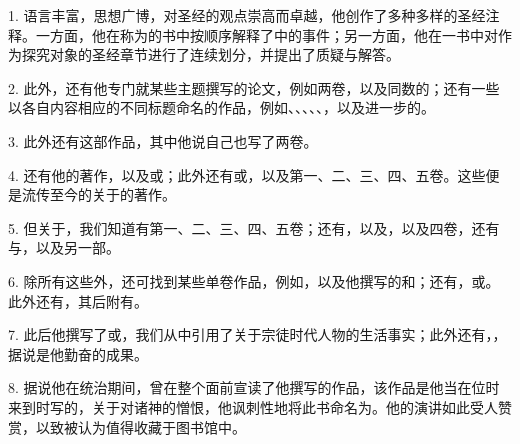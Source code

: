 1. 语言丰富，思想广博，对圣经的观点崇高而卓越，他创作了多种多样的圣经注释。一方面，他在称为的书中按顺序解释了中的事件；另一方面，他在一书中对作为探究对象的圣经章节进行了连续划分，并提出了质疑与解答。\par

2. 此外，还有他专门就某些主题撰写的论文，例如两卷，以及同数的；还有一些以各自内容相应的不同标题命名的作品，例如、、、、、，以及进一步的。\par

3. 此外还有这部作品，其中他说自己也写了两卷。\par

4. 还有他的著作，以及或；此外还有或，以及第一、二、三、四、五卷。这些便是流传至今的关于的著作。\par

5. 但关于，我们知道有第一、二、三、四、五卷；还有，以及，以及四卷，还有与，以及另一部。\par

6. 除所有这些外，还可找到某些单卷作品，例如，以及他撰写的和；还有，或。此外还有，其后附有。\par

7. 此后他撰写了或，我们从中引用了关于宗徒时代人物的生活事实；此外还有，，据说是他勤奋的成果。\par

8. 据说他在统治期间，曾在整个面前宣读了他撰写的作品，该作品是他当在位时来到时写的，关于对诸神的憎恨，他讽刺性地将此书命名为。他的演讲如此受人赞赏，以致被认为值得收藏于图书馆中。\par

